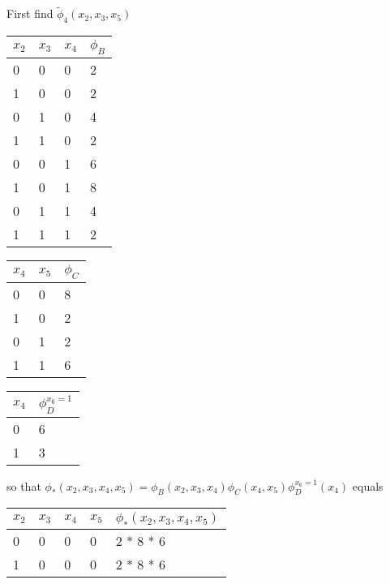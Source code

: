 \begin{exenumerate}
\begin{solution}
    First find $\tilde{\phi}_4(x_2, x_3, x_5)$
    \begin{center}
      \begin{tabular}{llll}
        \toprule
        $x_2$ & $x_3$ & $x_4$ & $\phi_B$\\
        \midrule
        0 & 0 & 0 & 2 \\
        1 & 0 & 0 & 2 \\
        0 & 1 & 0 & 4 \\
        1 & 1 & 0 & 2 \\
        0 & 0 & 1 & 6 \\
        1 & 0 & 1 & 8 \\
        0 & 1 & 1 & 4 \\
        1 & 1 & 1 & 2 \\
        \bottomrule
      \end{tabular}\hspace{2ex}
      \begin{tabular}{lll}
        \toprule
        $x_4$ & $x_5$ & $\phi_C$\\
        \midrule
        0 & 0 & 8 \\
        1 & 0 & 2 \\
        0 & 1 & 2 \\
        1 & 1 & 6 \\
        \bottomrule
      \end{tabular}\hspace{2ex}
      \begin{tabular}{ll}
        \toprule
        $x_4$ & $\phi_D^{x_6=1}$\\
        \midrule
        0 & 6 \\
        1 & 3 \\
        \bottomrule
      \end{tabular}
    \end{center}
    so that  $\phi_*(x_2,x_3,x_4,x_5) = \phi_B(x_2, x_3, x_4) \phi_C(x_4, x_5) \phi_D^{x_6=1}(x_4)$ equals
    \begin{center}
      \begin{tabular}{lllll}
        \toprule
        $x_2$ & $x_3$ & $x_4$& $x_5$ & $\phi_*(x_2,x_3,x_4,x_5)$\\
        \midrule
        0 & 0 & 0 & 0 & 2 * 8 * 6 \\
        1 & 0 & 0 & 0 & 2 * 8 * 6 \\

\end{tabular}
\end{center}
\end{solution}
\end{exenumerate}
